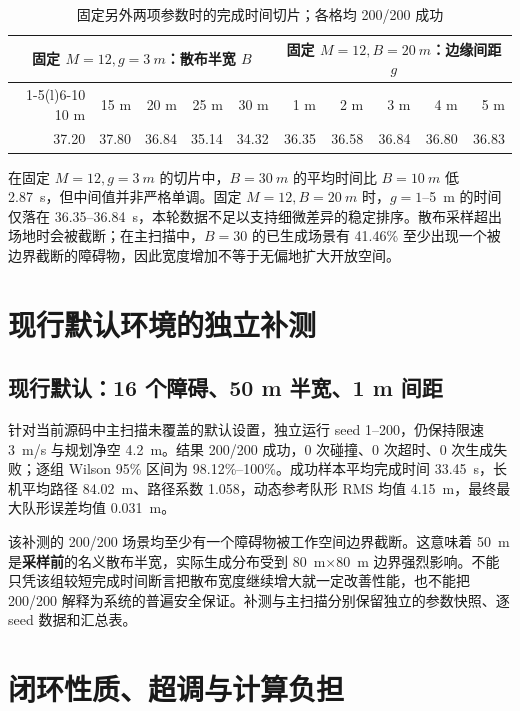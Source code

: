 \documentclass[UTF8,a4paper,11pt,fontset=windows]{ctexart}
\begin{document}
\begin{table}[H]\centering\small
\caption{固定另外两项参数时的完成时间切片；各格均 200/200 成功}
\label{tab:center-other}
\begin{tabular}{@{}rrrrrrrrrr@{}}
\toprule
\multicolumn{5}{c}{固定 $M=12,g=\SI{3}{m}$：散布半宽 $B$} &
\multicolumn{5}{c}{固定 $M=12,B=\SI{20}{m}$：边缘间距 $g$} \\
\cmidrule(lr){1-5}\cmidrule(l){6-10}
10 m & 15 m & 20 m & 25 m & 30 m & 1 m & 2 m & 3 m & 4 m & 5 m \\
\midrule
37.20 & 37.80 & 36.84 & 35.14 & 34.32 & 36.35 & 36.58 & 36.84 & 36.80 & 36.83 \\
\bottomrule
\end{tabular}
\end{table}
在固定 $M=12,g=\SI{3}{m}$ 的切片中，$B=\SI{30}{m}$ 的平均时间比 $B=\SI{10}{m}$ 低 \SI{2.87}{s}，但中间值并非严格单调。固定 $M=12,B=\SI{20}{m}$ 时，$g=1$--\SI{5}{m} 的时间仅落在 36.35--\SI{36.84}{s}，本轮数据不足以支持细微差异的稳定排序。散布采样超出场地时会被截断；在主扫描中，$B=30$ 的已生成场景有 41.46\% 至少出现一个被边界截断的障碍物，因此宽度增加不等于无偏地扩大开放空间。

\section{现行默认环境的独立补测}
\subsection{现行默认：16 个障碍、50 m 半宽、1 m 间距}
针对当前源码中主扫描未覆盖的默认设置，独立运行 seed 1--200，仍保持限速 \SI{3}{m/s} 与规划净空 \SI{4.2}{m}。结果 200/200 成功，0 次碰撞、0 次超时、0 次生成失败；逐组 Wilson 95\% 区间为 98.12\%--100\%。成功样本平均完成时间 \SI{33.45}{s}，长机平均路径 \SI{84.02}{m}、路径系数 1.058，动态参考队形 RMS 均值 \SI{4.15}{m}，最终最大队形误差均值 \SI{0.031}{m}。

该补测的 200/200 场景均至少有一个障碍物被工作空间边界截断。这意味着 \SI{50}{m} 是\textbf{采样前}的名义散布半宽，实际生成分布受到 \SI{80}{m}$\times$\SI{80}{m} 边界强烈影响。不能只凭该组较短完成时间断言把散布宽度继续增大就一定改善性能，也不能把 200/200 解释为系统的普遍安全保证。补测与主扫描分别保留独立的参数快照、逐 seed 数据和汇总表。

\section{闭环性质、超调与计算负担}
\end{document}
